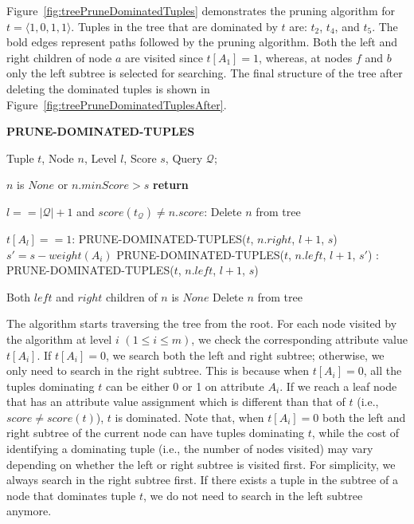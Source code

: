 Figure~\ref{fig:treePruneDominatedTuples} demonstrates the pruning algorithm for $t = \langle 1,0,1,1 \rangle$. Tuples in the tree that are dominated by $t$ are: $t_2$, $t_4$, and $t_5$. The bold edges represent paths followed by the pruning algorithm. Both the left and right children of node $a$ are visited since $t[A_1] = 1$, whereas, at nodes $f$ and $b$ only the left subtree is selected for searching. The final structure of the tree after deleting the dominated tuples is shown in Figure~\ref{fig:treePruneDominatedTuplesAfter}.

\begin{algorithm}[htb]
\caption{{\bf PRUNE-DOMINATED-TUPLES}}
\begin{algorithmic}[1]
\label{alg:pruneDominatedTuples}
 Tuple $t$, Node $n$, Level $l$, Score $s$, Query $\mathcal{Q}$;

 $n$ is $None$ or $n.minScore > s$ {\bf return}

 $l == |\mathcal{Q}| + 1$ and $score(t_{\mathcal{Q}}) \neq n.score$:
    \STATE \hindent Delete $n$ from tree
    \STATE {}

 $t[A_l] == 1$:
    \STATE \hindent PRUNE-DOMINATED-TUPLES($t$, $n.right$, $l+1$, $s$)
    \STATE \hindent $s' = s - weight(A_i)$
    \STATE \hindent PRUNE-DOMINATED-TUPLES($t$, $n.left$, $l+1$, $s'$)
:
    \STATE \hindent PRUNE-DOMINATED-TUPLES($t$, $n.left$, $l+1$, $s$)

 Both $left$ and $right$ children of $n$ is $None$
    \STATE \hindent Delete $n$ from tree
\end{algorithmic}
\end{algorithm}


\vspace{1mm}
 The algorithm starts traversing the tree from the root. For each node visited by the algorithm at level $i$ $(1 \leq i \leq m)$, we check the corresponding attribute value $t[A_i]$. If $t[A_i] = 0$, we search both the left and right subtree; otherwise, we only need to search in the right subtree. This is because when $t[A_i] = 0$, all the tuples dominating $t$ can be either 0 or 1 on attribute $A_i$. If we reach a leaf node that has an attribute value assignment which is different than that of $t$ (i.e., $score \neq score(t)$), $t$ is dominated.  Note that, when $t[A_i] = 0$ both the left and right subtree of the current node can have tuples dominating $t$, while the cost of identifying a dominating tuple (i.e., the number of nodes visited) may vary depending on whether the left or right subtree is visited first. For simplicity, we always search in the right subtree first. If there exists a tuple in the subtree of a node that dominates tuple $t$, we do not need to search in the left subtree anymore. 

